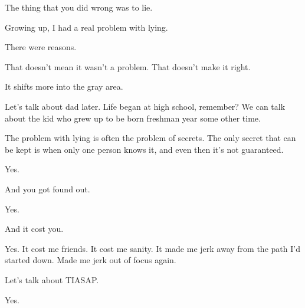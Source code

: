 \begin{ally}
The thing that you did wrong was to lie.
\end{ally}
\newpage

Growing up, I had a real problem with lying.

\begin{ally}
There were reasons.
\end{ally}
That doesn't mean it wasn't a problem. That doesn't make it right.

\begin{ally}
It shifts more into the gray area.
\end{ally}
Let's talk about dad later. Life began at high school, remember? We can talk about the kid who grew up to be born freshman year some other time.

\begin{ally}
The problem with lying is often the problem of secrets. The only secret that can be kept is when only one person knows it, and even then it's not guaranteed.
\end{ally}
Yes.

\begin{ally}
And you got found out.
\end{ally}
Yes.

\begin{ally}
And it cost you.
\end{ally}
Yes. It cost me friends. It cost me sanity. It made me jerk away from the path I'd started down. Made me jerk out of focus again.

\begin{ally}
Let's talk about TIASAP.
\end{ally}
Yes.
\newpage

